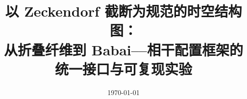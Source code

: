 \documentclass[11pt,letterpaper]{ctexart}
\title{以 Zeckendorf 截断为规范的时空结构图：\\从折叠纤维到 Babai--\WL{}--相干配置框架的统一接口与可复现实验}
\author{}
\date{\today}
\begin{document}
\maketitle












\FloatBarrier
\appendix


\FloatBarrier

\end{document}
